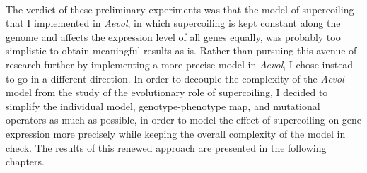 \paragraph{}
The verdict of these preliminary experiments was that the model of supercoiling that I implemented in \emph{Aevol}, in which supercoiling is kept constant along the genome and affects the expression level of all genes equally, was probably too simplistic to obtain meaningful results as-is.
Rather than pursuing this avenue of research further by implementing a more precise model in \emph{Aevol}, I chose instead to go in a different direction.
In order to decouple the complexity of the \emph{Aevol} model from the study of the evolutionary role of supercoiling, I decided to simplify the individual model, genotype-phenotype map, and mutational operators as much as possible, in order to model the effect of supercoiling on gene expression more precisely while keeping the overall complexity of the model in check.
The results of this renewed approach are presented in the following chapters.